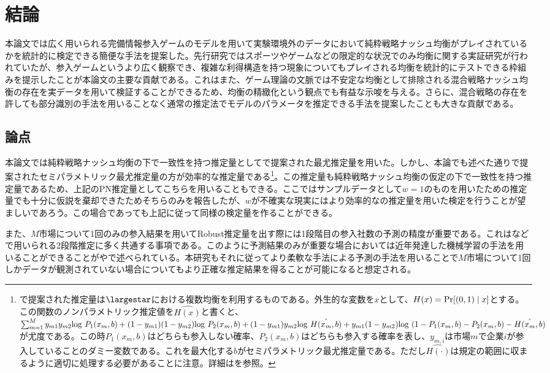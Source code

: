 
\chapter{結論}
本論文では広く用いられる完備情報参入ゲームのモデルを用いて実験環境外のデータにおいて純粋戦略ナッシュ均衡がプレイされているかを統計的に検定できる簡便な手法を提案した。先行研究ではスポーツやゲームなどの限定的な状況でのみ均衡に関する実証研究が行われていたが、参入ゲームというより広く観察でき、複雑な利得構造を持つ現象についてもプレイされる均衡を統計的にテストできる枠組みを提示したことが本論文の主要な貢献である。これはまた、ゲーム理論の文脈では不安定な均衡として排除される混合戦略ナッシュ均衡の存在を実データを用いて検証することができるため、均衡の精緻化という観点でも有益な示唆を与える。さらに、混合戦略の存在を許しても部分識別の手法を用いることなく通常の推定法でモデルのパラメータを推定できる手法を提案したことも大きな貢献である。

\section{論点}
本論文では純粋戦略ナッシュ均衡の下で一致性を持つ推定量として\cite{Bresnahan1991}で提案された最尤推定量を用いた。しかし、本論でも述べた通り\cite{Tamer2003a}で提案されたセミパラメトリック最尤推定量の方が効率的な推定量である\footnote{\cite{Tamer2003a}で提案された推定量は$\largestar$における複数均衡を利用するものである。外生的な変数を$x$として、$H(x) = {\rm Pr}[(0,1)\mid x]$とする。この関数のノンパラメトリック推定値を$\hat{H(x)}$と書くと、$\sum_{m = 1}^{M} y_{m1}y_{m2} {\rm log}\ P_1(x_m, b) + (1-y_{m1})(1-y_{m2}) {\rm log}\ P_2(x_m, b) + (1-y_{m1})y_{m2} {\rm log}\ \hat{H(x_m, b)} + y_{m1}(1-y_{m2}) {\rm log}\ (1-P_1(x_m, b)-P_2(x_m, b) - \hat{H(x_m, b)}$が尤度である。この時$P_1(x_m, b)$はどちらも参入しない確率、$P_2(x_m, b)$はどちらも参入する確率を表し、$y_{m, i}$は市場$m$で企業$i$が参入していることのダミー変数である。これを最大化する$b$がセミパラメトリック最尤推定量である。ただし$\hat{H(\cdot)}$は規定の範囲に収まるように適切に処理する必要があることに注意。詳細は\cite{Tamer2003a}を参照。}。この推定量も純粋戦略ナッシュ均衡の仮定の下で一致性を持つ推定量であるため、上記のPN推定量としてこちらを用いることもできる。ここではサンプルデータとして$w = 1$のものを用いたため\cite{Bresnahan1991}の推定量でも十分に仮説を棄却できたためそちらのみを報告したが、$w$が不確実な現実にはより効率的な\cite{Tamer2003a}の推定量を用いた検定を行うことが望ましいであろう。この場合であっても上記に従って同様の検定量を作ることができる。

また、$M$市場について1回のみの参入結果を用いてRobust推定量を出す際には1段階目の参入社数の予測の精度が重要である。これは\cite{Seim2006}などで用いられる2段階推定に多く共通する事項である。このように予測結果のみが重要な場合においては近年発達した機械学習の手法を用いることができることが\cite{Mullainathan2017}や\cite{Igami2017}で述べられている。本研究もそれに従ってより柔軟な手法による予測の手法を用いることで$M$市場について1回しかデータが観測されていない場合についてもより正確な推定結果を得ることが可能になると想定される。

